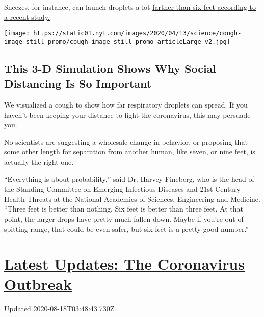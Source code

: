 Sneezes, for instance, can launch droplets a lot
\href{https://jamanetwork.com/journals/jama/fullarticle/2763852}{farther
than six feet according to a recent study.}

\href{https://www.nytimes.com/interactive/2020/04/14/science/coronavirus-transmission-cough-6-feet-ar-ul.html}{}

\texttt{[image: https://static01.nyt.com/images/2020/04/13/science/cough-image-still-promo/cough-image-still-promo-articleLarge-v2.jpg]}

\hypertarget{this-3-d-simulation-shows-why-social-distancing-is-so-important}{%
\subsection{This 3-D Simulation Shows Why Social Distancing Is So
Important}\label{this-3-d-simulation-shows-why-social-distancing-is-so-important}}

We visualized a cough to show how far respiratory droplets can spread.
If you haven't been keeping your distance to fight the coronavirus, this
may persuade you.

No scientists are suggesting a wholesale change in behavior, or
proposing that some other length for separation from another human, like
seven, or nine feet, is actually the right one.

``Everything is about probability,'' said Dr. Harvey Fineberg, who is
the head of the Standing Committee on Emerging Infectious Diseases and
21st Century Health Threats at the National Academies of Sciences,
Engineering and Medicine. ``Three feet is better than nothing. Six feet
is better than three feet. At that point, the larger drops have pretty
much fallen down. Maybe if you're out of spitting range, that could be
even safer, but six feet is a pretty good number.''

\hypertarget{latest-updates-the-coronavirus-outbreak}{%
\section{\texorpdfstring{\href{https://www.nytimes.com/2020/08/17/world/coronavirus-covid.html?action=click\&pgtype=Article\&state=default\&region=MAIN_CONTENT_1\&context=storylines_live_updates}{Latest
Updates: The Coronavirus
Outbreak}}{Latest Updates: The Coronavirus Outbreak}}\label{latest-updates-the-coronavirus-outbreak}}

Updated 2020-08-18T03:48:43.730Z

